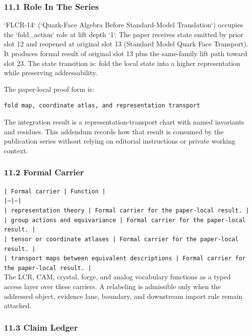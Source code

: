 \documentclass[11pt]{article}
\begin{document}
\subsubsection*{11.1 Role In The Series}

`FLCR-14` (`Quark-Face Algebra Before Standard-Model Translation`) occupies the `fold\_action` role at lift depth `1`.
The paper receives state emitted by prior slot 12 and reopened at original slot 13 (Standard Model Quark Face Transport). It produces formal result of original slot 13 plus the same-family lift path toward slot 23. The state transition is:
fold the local state into a higher representation while preserving addressability.

The paper-local proof form is:

\begin{verbatim}
fold map, coordinate atlas, and representation transport
\end{verbatim}

The integration result is a representation-transport chart with named invariants and residues. This addendum records how that result is
consumed by the publication series without relying on editorial instructions or
private working context.

\subsubsection*{11.2 Formal Carrier}

\noindent\texttt{| Formal carrier | Function |}\\
\noindent\texttt{|---|---|}\\
\noindent\texttt{| representation theory | Formal carrier for the paper-local result. |}\\
\noindent\texttt{| group actions and equivariance | Formal carrier for the paper-local result. |}\\
\noindent\texttt{| tensor or coordinate atlases | Formal carrier for the paper-local result. |}\\
\noindent\texttt{| transport maps between equivalent descriptions | Formal carrier for the paper-local result. |}\\

The LCR, CAM, crystal, forge, and analog vocabulary functions as a typed access
layer over these carriers. A relabeling is admissible only when the addressed
object, evidence lane, boundary, and downstream import rule remain attached.

\subsubsection*{11.3 Claim Ledger}
\end{document}
